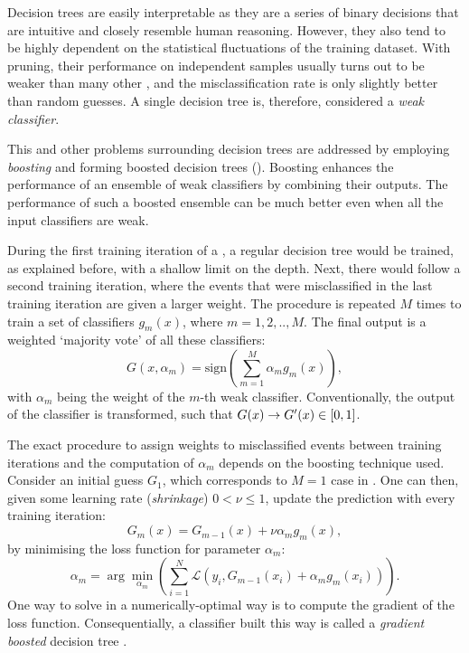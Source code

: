 Decision trees are easily interpretable as they are a series of binary decisions that are intuitive and closely resemble human reasoning.
However, they also tend to be highly dependent on the statistical fluctuations of the training dataset.
With pruning, their performance on independent samples usually turns out to be weaker than many other , and the misclassification rate is only slightly better than random guesses.
A single decision tree is, therefore, considered a \textit{weak classifier}.

This and other problems surrounding decision trees are addressed by employing \textit{boosting} and forming boosted decision trees ().
Boosting enhances the performance of an ensemble of weak classifiers by combining their outputs. 
The performance of such a boosted ensemble can be much better even when all the input classifiers are weak.

During the first training iteration of a \BDT, a regular decision tree would be trained, as explained before, with a shallow limit on the depth.
Next, there would follow a second training iteration, where the events that were misclassified in the last training iteration are given a larger weight.
The procedure is repeated $M$ times to train a set of classifiers $g_{m}(x)$, where $m=1,2,..,M$.
The final output is a weighted `majority vote' of all these classifiers:
\begin{equation}\label{eq:boosted_classifier}
    G(x, \alpha_m) = \mathrm{sign}(\sum_{m=1}^M\alpha_mg_m(x)),
\end{equation}
with $\alpha_m$ being the weight of the $m$-th weak classifier.
Conventionally, the output of the classifier is transformed, such that $G(x)\rightarrow G'(x)\in[0,1]$.

The exact procedure to assign weights to misclassified events between training iterations and the computation of $\alpha_m$ depends on the boosting technique used.
Consider an initial guess $G_1$, which corresponds to $M=1$ case in .
One can then, given some learning rate (\textit{shrinkage}) $0<\nu\leq1$, update the prediction with every training iteration:
\begin{equation}
    G_m(x) = G_{m-1}(x) + \nu\alpha_mg_m(x),
\end{equation}
by minimising the loss function for parameter $\alpha_m$: 
\begin{equation}\label{eq:minimize_loss}
    \alpha_m = \arg\min_{\alpha_m}\left(\sum_{i=1}^N\mathcal{L}(y_i, G_{m-1}(x_i) + \alpha_mg_m(x_i))\right).
\end{equation}
One way to solve  in a numerically-optimal way is to compute the gradient of the loss function.
Consequentially, a classifier built this way is called a \textit{gradient boosted} decision tree \cite{FRIEDMAN1013203451}.

